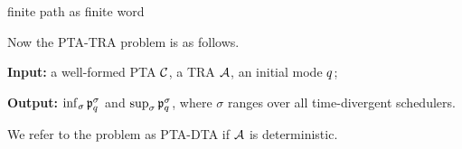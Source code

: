 {\color{red} finite path as finite word}

Now the {\sc PTA-TRA} problem is as follows.

\begin{compactitem}
\item {\bf Input:} a well-formed PTA $\mathcal{C}$, a TRA $\mathcal{A}$, an initial mode $q$;
\item {\bf Output:} $\inf_\sigma \mathfrak{p}_{q}^{\sigma}$ and $\sup_\sigma  \mathfrak{p}_{q}^{\sigma}$, where $\sigma$ ranges over all time-divergent schedulers.
\end{compactitem}

We refer to the problem as PTA-DTA if $\mathcal{A}$ is deterministic.



